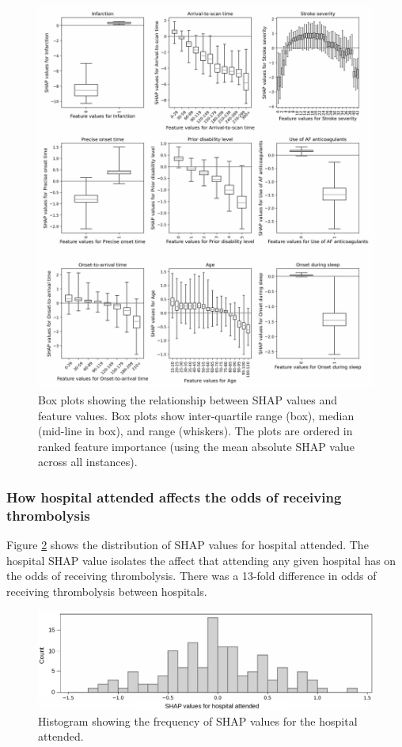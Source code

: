 \begin{figure}
    \centering
    \includegraphics[width=1\linewidth]{images/p2_patient_shap.jpg}
    \caption{Box plots showing the relationship between SHAP values and feature values. Box plots show inter-quartile range (box), median (mid-line in box), and range (whiskers). The plots are ordered in ranked feature importance (using the mean absolute SHAP value across all instances).}
    \label{fig:global_shap}
\end{figure}

\subsubsection{How hospital attended affects the odds of receiving thrombolysis}

Figure \ref{fig:hospital_shap} shows the distribution of SHAP values for hospital attended. The hospital SHAP value isolates the affect that attending any given hospital has on the odds of receiving thrombolysis. There was a 13-fold difference in odds of receiving thrombolysis between hospitals.

\begin{figure}
    \centering
    \includegraphics[width=1\linewidth]{images/p2_hosp_shap.jpg}
    \caption{Histogram showing the frequency of SHAP values for the hospital attended.}
    \label{fig:hospital_shap}
\end{figure}

